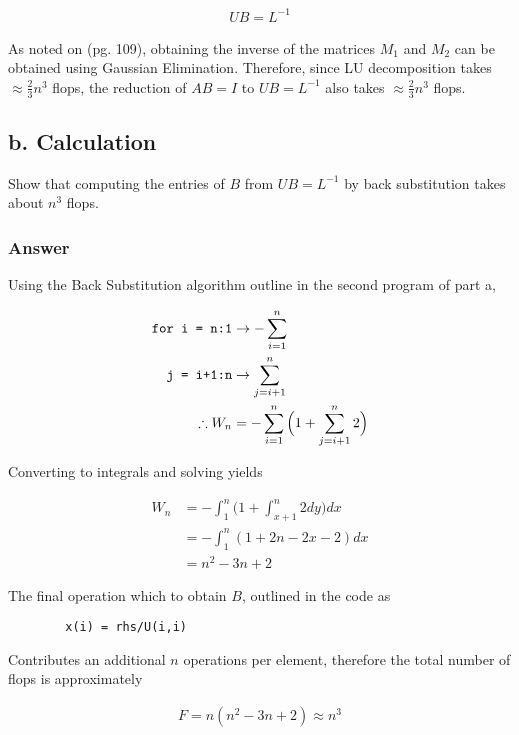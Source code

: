 \documentclass{article}
\def\code#1{\texttt{#1}}
\begin{document}
		\begin{align*}
			UB=L^{-1}
		\end{align*}
		
		As noted on \cite{BG}(pg. 109), obtaining the inverse of the matrices $M_{1}$ and $M_{2}$ can be obtained using Gaussian Elimination.  Therefore, since LU decomposition takes $\approx\frac{2}{3}n^3$ flops, the reduction of $AB=I$ to $UB=L^{-1}$ also takes $\approx\frac{2}{3}n^3$ flops.
		\subsection{b. Calculation}
		Show that computing the entries of $B$ from $UB=L^{-1}$ by back substitution takes about $n^{3}$ flops.
	
		\subsubsection{Answer}
		
		Using the Back Substitution algorithm outline in the second program of part a,
		
		\begin{align*}
		\text{\code{for i = n:1}}&\rightarrow-\sum_{i=1}^{n}\\
		\text{\code{j = i+1:n}}&\rightarrow\sum_{j=i+1}^{n}\\
		\therefore W_{n}&=-\sum_{i=1}^{n}\Big(1+\sum_{j=i+1}^{n}2\Big)
		\end{align*}
		
		Converting to integrals and solving yields
		
		\begin{align*}
			W_{n}&=-\int_{1}^{n}\Big(1+\int_{x+1}^{n}2dy)dx\\
			&=-\int_{1}^{n}(1+2n-2x-2)dx\\
			&=n^2-3n+2
		\end{align*}
		
		The final operation which to obtain $B$, outlined in the code as 
		
		\begin{lstlisting}
		x(i) = rhs/U(i,i)
		\end{lstlisting}
		
		Contributes an additional $n$ operations per element, therefore the total number of flops is approximately
		
		\begin{align*}
			F=n(n^{2}-3n+2)\approx n^3
		\end{align*}
		
\end{document}
